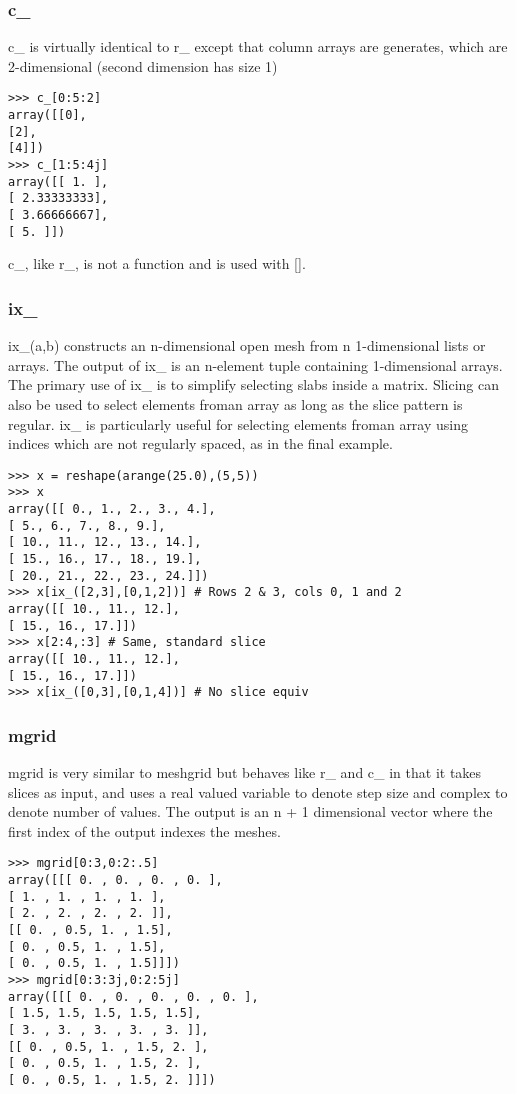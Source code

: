 {\subsubsection{c_}
c\_ is virtually identical to r\_ except that column arrays are generates, which are 2-dimensional (second
dimension has size 1)
\begin{framed}
\begin{verbatim}
>>> c_[0:5:2]
array([[0],
[2],
[4]])
>>> c_[1:5:4j]
array([[ 1. ],
[ 2.33333333],
[ 3.66666667],
[ 5. ]])
\end{verbatim}
\end{framed}
c\_, like r\_, is not a function and is used with [].

\subsubsection{ix_}
ix\_(a,b) constructs an n-dimensional open mesh from n 1-dimensional lists or arrays. The output of
ix\_ is an n-element tuple containing 1-dimensional arrays. The primary use of ix\_ is to simplify selecting
slabs inside a matrix. Slicing can also be used to select elements froman array as long as the slice pattern is
regular. ix\_ is particularly useful for selecting elements froman array using indices which are not regularly
spaced, as in the final example.
\begin{framed}
\begin{verbatim}
>>> x = reshape(arange(25.0),(5,5))
>>> x
array([[ 0., 1., 2., 3., 4.],
[ 5., 6., 7., 8., 9.],
[ 10., 11., 12., 13., 14.],
[ 15., 16., 17., 18., 19.],
[ 20., 21., 22., 23., 24.]])
>>> x[ix_([2,3],[0,1,2])] # Rows 2 & 3, cols 0, 1 and 2
array([[ 10., 11., 12.],
[ 15., 16., 17.]])
>>> x[2:4,:3] # Same, standard slice
array([[ 10., 11., 12.],
[ 15., 16., 17.]])
>>> x[ix_([0,3],[0,1,4])] # No slice equiv
\end{verbatim}
\end{framed}
\subsubsection{mgrid}
mgrid is very similar to meshgrid but behaves like r\_ and c\_ in that it takes slices as input, and uses a
real valued variable to denote step size and complex to denote number of values. The output is an n + 1
dimensional vector where the first index of the output indexes the meshes.
\begin{framed}
\begin{verbatim}
>>> mgrid[0:3,0:2:.5]
array([[[ 0. , 0. , 0. , 0. ],
[ 1. , 1. , 1. , 1. ],
[ 2. , 2. , 2. , 2. ]],
[[ 0. , 0.5, 1. , 1.5],
[ 0. , 0.5, 1. , 1.5],
[ 0. , 0.5, 1. , 1.5]]])
>>> mgrid[0:3:3j,0:2:5j]
array([[[ 0. , 0. , 0. , 0. , 0. ],
[ 1.5, 1.5, 1.5, 1.5, 1.5],
[ 3. , 3. , 3. , 3. , 3. ]],
[[ 0. , 0.5, 1. , 1.5, 2. ],
[ 0. , 0.5, 1. , 1.5, 2. ],
[ 0. , 0.5, 1. , 1.5, 2. ]]])
\end{verbatim}
\end{framed}

}
